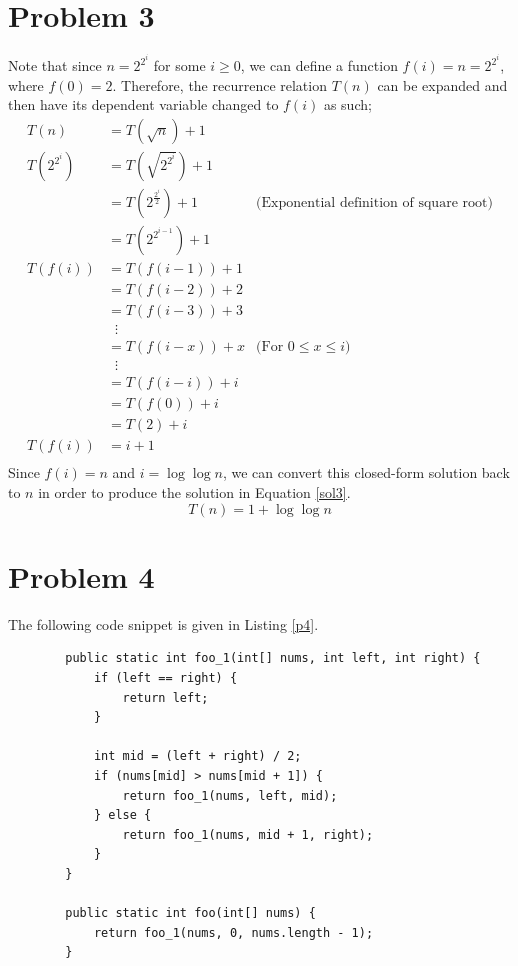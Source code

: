 \documentclass{report}
\begin{document}
\section{Problem 3}
Note that since $n=2^{2^i}$ for some $i \geq 0$, we can define a function $f(i) = n = 2^{2^i}$, where $f(0) = 2$. Therefore, the recurrence relation $T(n)$ can be expanded and then have its dependent variable changed to $f(i)$ as such;
\begin{align*}
	T(n) &= T(\sqrt{n}) + 1 \\
	T(2^{2^{i}}) &= T(\sqrt{2^{2^i}}) + 1 \\
		&= T(2^{\frac{2^i}{2}}) + 1 &\text{(Exponential definition of square root)} \\
		&= T(2^{2^{i-1}}) + 1 \\
	T(f(i)) &= T(f(i-1)) + 1 \\
		&= T(f(i-2)) + 2 \\
		&= T(f(i-3)) + 3 \\
		&\;\; \vdots \\
		&= T(f(i-x)) + x &\text{(For $0 \leq x \leq i$)} \\
		&\;\; \vdots \\
		&= T(f(i-i)) + i \\
		&= T(f(0)) + i \\ 
		&= T(2) + i \\
	T(f(i)) &= i + 1 \\
\end{align*}
Since $f(i) = n$ and $i = \log\log n$, we can convert this closed-form solution back to $n$ in order to produce the solution in Equation \ref{sol3}.
\begin{equation}
	\boxed{T(n) = 1 + \log\log n}
	\label{sol3}
\end{equation}

\section{Problem 4}
The following code snippet is given in Listing \ref{p4}.
\begin{listing}[H]
	\begin{verbatim}
		public static int foo_1(int[] nums, int left, int right) {
			if (left == right) {
				return left;
			}
			
			int mid = (left + right) / 2;
			if (nums[mid] > nums[mid + 1]) {
				return foo_1(nums, left, mid);
			} else {
				return foo_1(nums, mid + 1, right);
			}
		}
		
		public static int foo(int[] nums) {
			return foo_1(nums, 0, nums.length - 1);
		}
	\end{verbatim}
	\caption{Recursive code snippet.}
	\label{p4}
\end{listing}
\end{document}
